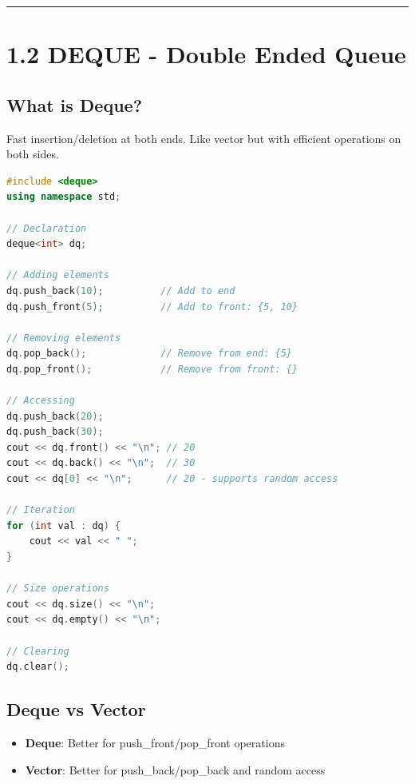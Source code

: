 \begin{center}\rule{0.5\linewidth}{0.5pt}\end{center}

\hypertarget{deque---double-ended-queue}{%
\section{1.2 DEQUE - Double Ended
Queue}\label{deque---double-ended-queue}}

\hypertarget{what-is-deque}{%
\subsection{What is Deque?}\label{what-is-deque}}

Fast insertion/deletion at both ends. Like vector but with efficient
operations on both sides.

\begin{lstlisting}[language={C++}]
#include <deque>
using namespace std;

// Declaration
deque<int> dq;

// Adding elements
dq.push_back(10);          // Add to end
dq.push_front(5);          // Add to front: {5, 10}

// Removing elements
dq.pop_back();             // Remove from end: {5}
dq.pop_front();            // Remove from front: {}

// Accessing
dq.push_back(20);
dq.push_back(30);
cout << dq.front() << "\n"; // 20
cout << dq.back() << "\n";  // 30
cout << dq[0] << "\n";      // 20 - supports random access

// Iteration
for (int val : dq) {
    cout << val << " ";
}

// Size operations
cout << dq.size() << "\n";
cout << dq.empty() << "\n";

// Clearing
dq.clear();
\end{lstlisting}

\hypertarget{deque-vs-vector}{%
\subsection{Deque vs Vector}\label{deque-vs-vector}}

\begin{itemize}
\tightlist
\item
  \textbf{Deque}: Better for push\_front/pop\_front operations
\item
  \textbf{Vector}: Better for push\_back/pop\_back and random access
\end{itemize}

